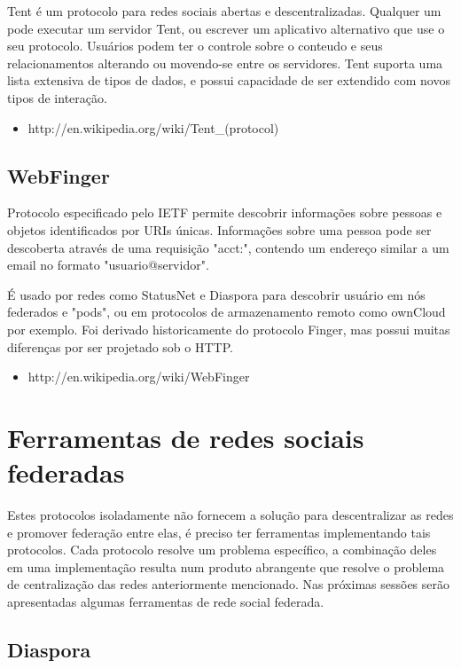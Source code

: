 \documentclass[12pt]{article}
\begin{document}
Tent é um protocolo para redes sociais abertas e descentralizadas.  Qualquer
um pode executar um servidor Tent, ou escrever um aplicativo alternativo que
use o seu protocolo. Usuários podem ter o controle sobre o conteudo e seus
relacionamentos alterando ou movendo-se entre os servidores. Tent suporta uma
lista extensiva de tipos de dados, e possui capacidade de ser extendido com
novos tipos de interação.

\begin{itemize}
  \item http://en.wikipedia.org/wiki/Tent\_(protocol)
\end{itemize}

\subsection{WebFinger}

Protocolo especificado pelo IETF permite descobrir informações sobre pessoas e
objetos identificados por URIs únicas. Informações sobre uma pessoa pode ser
descoberta através de uma requisição "acct:", contendo um endereço similar a
um email no formato "usuario@servidor".

É usado por redes como StatusNet e Diaspora para descobrir usuário em nós
federados e "pods", ou em protocolos de armazenamento remoto como ownCloud por
exemplo. Foi derivado historicamente do protocolo Finger, mas possui muitas
diferenças por ser projetado sob o HTTP.

\begin{itemize}
  \item http://en.wikipedia.org/wiki/WebFinger
\end{itemize}

\section{Ferramentas de redes sociais federadas}

Estes protocolos isoladamente não fornecem a solução para descentralizar as
redes e promover federação entre elas, é preciso ter ferramentas implementando
tais protocolos. Cada protocolo resolve um problema específico, a combinação
deles em uma implementação resulta num produto abrangente que resolve o
problema de centralização das redes anteriormente mencionado. Nas próximas
sessões serão apresentadas algumas ferramentas de rede social federada.

\subsection{Diaspora}
\end{document}

